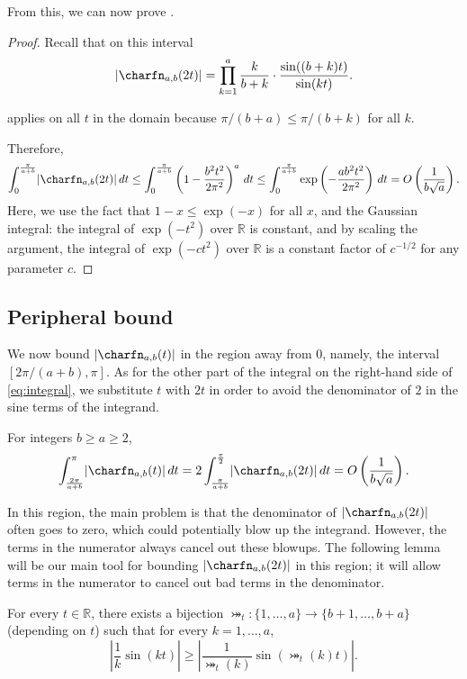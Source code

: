 From this, we can now prove .

\begin{proof}
    Recall that on this interval
    \[\lvert\charfn_{a,b}(2t)\rvert=\prod_{k=1}^{a} \frac{k}{b+k}\cdot\frac{\sin((b+k)t)}{\sin(kt)}.\]
    
 applies on all $t$ in the domain because $\pi/(b+a)\le \pi/(b+k)$ for all $k$.
    
    Therefore,
    \[\int_0^{\frac{\pi}{a+b}} \lvert\charfn_{a,b}(2t)\rvert\,dt \le \int_0^{\frac{\pi}{a+b}} \left(1-\frac{b^2t^2}{2\pi^2}\right)^a\,dt \le \int_0^{\frac{\pi}{a+b}} \exp\left(-\frac{ab^2t^2}{2\pi^2}\right)\,dt =O\left(\frac{1}{b\sqrt{a}}\right). \]
    Here, we use the fact that $1-x\le \exp(-x)$ for all $x$, and the Gaussian integral: the integral of $\exp(-t^2)$ over $\mathbb{R}$ is constant, and by scaling the argument, the integral of $\exp(-ct^2)$ over $\mathbb{R}$ is a constant factor of $c^{-1/2}$ for any parameter $c$. 
\end{proof}

\subsection{Peripheral bound}
\label{sec:peripheral}

We now bound $\lvert\charfn_{a,b}(t)\rvert$ in the region away from $0$, namely, the interval $[2\pi/(a+b),\pi]$. As for the other part of the integral on the right-hand side of \eqref{eq:integral}, we substitute $t$ with $2t$ in order to avoid the denominator of $2$ in the sine terms of the integrand. 

\begin{lemma}
    \label{lemma:far}
    For integers $b\ge a\ge 2$,
    \[ \int_{\frac{2\pi}{a+b}}^\pi \lvert\charfn_{a,b}(t)\rvert\, dt =  2 \int_{\frac{\pi}{a+b}}^{\frac{\pi}{2}} \lvert\charfn_{a,b}(2t)\rvert\, dt = O\left(\frac{1}{b\sqrt{a}}\right). \]    
\end{lemma}

In this region, the main problem is that the denominator of $\lvert\charfn_{a,b}(2t)\rvert$ often goes to zero, which could potentially blow up the integrand. However, the terms in the numerator always cancel out these blowups. The following lemma will be our main tool for bounding $\lvert\charfn_{a,b}(2t)\rvert$ in this region; it will allow terms in the numerator to cancel out bad terms in the denominator.

\begin{lemma}
    \label{lemma:bijection}
    For every $t\in\mathbb{R}$, there exists a bijection $\bij_t:\{1,\dots,a\}\to\{b+1,\dots,b+a\}$ (depending on $t$) such that for every $k=1,\dots,a$,
    \[\left|\frac{1}{k}\sin(kt)\right| \ge \left|\frac{1}{\bij_t(k)}\sin(\bij_t(k)t)\right|. \]
\end{lemma}

